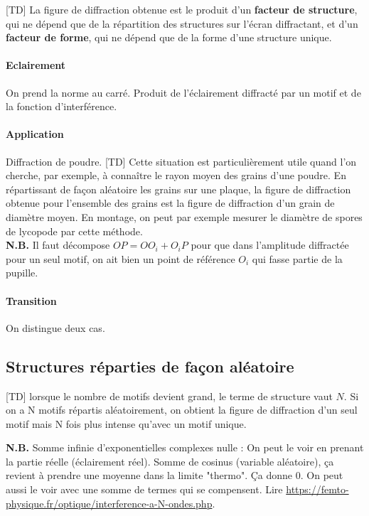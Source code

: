 \documentclass[11pt]{report}
\numberwithin{figure}{section}
\numberwithin{equation}{section}
\numberwithin{table}{section}
\newcommand{\1}{\boldsymbol{1}}
\begin{document}
[TD] La figure de diffraction obtenue est le produit d’un \textbf{facteur de structure}, qui ne dépend que de la répartition des structures sur l’écran diffractant, et d’un \textbf{facteur de forme}, qui ne dépend que de la forme d’une structure unique.

\paragraph{Eclairement} On prend la norme au carré. Produit de l'éclairement diffracté par un motif et de la fonction d'interférence.

\paragraph{Application} Diffraction de poudre. [TD] Cette situation est particulièrement utile quand l’on cherche, par exemple, à connaître le rayon moyen des grains d’une poudre. En répartissant de façon aléatoire les grains sur une plaque, la figure de diffraction obtenue pour l’ensemble des grains est la figure de diffraction d’un grain de diamètre moyen. En montage, on peut par exemple mesurer le diamètre de spores de lycopode par cette méthode. \\

\textbf{N.B.} Il faut décompose $OP = OO_i + O_iP$ pour que dans l'amplitude diffractée pour un seul motif, on ait bien un point de référence $O_i$ qui fasse partie de la pupille.


\paragraph{Transition} On distingue deux cas.


\subsection{Structures réparties de façon aléatoire}

[TD] lorsque le nombre de motifs devient grand, le terme de structure vaut $N$. Si on a N motifs répartis aléatoirement, on obtient la figure de diffraction d’un seul motif mais N fois plus intense qu’avec un motif unique.

\textbf{N.B.} Somme infinie d'exponentielles complexes nulle : On peut le voir en prenant la partie réelle (éclairement réel). Somme de cosinus (variable aléatoire), ça revient à prendre une moyenne dans la limite "thermo". Ça donne 0. On peut aussi le voir avec une somme de termes qui se compensent. Lire \url{https://femto-physique.fr/optique/interference-a-N-ondes.php}.
\end{document}
